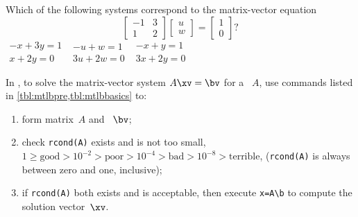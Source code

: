 \begin{activity}
Which of the following systems correspond to the matrix-vector equation
\begin{equation*}
\begin{bmatrix} -1&3\\1&2 \end{bmatrix}\begin{bmatrix} u\\w \end{bmatrix}=\begin{bmatrix} 1\\0 \end{bmatrix}?
\end{equation*}
{\(\begin{matrix} -x+3y=1\\x+2y=0 \end{matrix}\)}
{\(\begin{matrix} -u+w=1\\3u+2w=0 \end{matrix}\)}
{\(\begin{matrix} -x+y=1\\3x+2y=0 \end{matrix}\)}
\end{activity}




\begin{procedure} \label{pro:unisol}
In \script, to solve the matrix-vector system \(A\xv=\bv\) for a ~\(A\), use commands listed in \cref{tbl:mtlbpre,tbl:mtlbbasics} to:
\begin{enumerate}
\item form matrix~\(A\) and ~\(\bv\);
\item check \verb|rcond(A)| exists and is not too small, \(1\geq\text{good} >10^{-2} >\text{poor} >10^{-4} >\text{bad} >10^{-8} >\text{terrible}\), (\verb|rcond(A)| is always between zero and one, inclusive);
\item if \verb|rcond(A)| both exists and is acceptable, then execute \verb|x=A\b| to compute the solution vector~\(\xv\). 
\end{enumerate}
\end{procedure}


